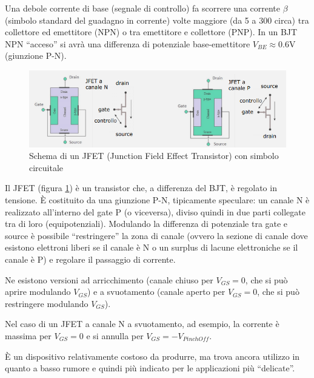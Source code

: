 \documentclass{article}
\begin{document}
\vspace{3mm}

Una debole corrente di base (segnale di controllo) fa scorrere una corrente $\beta$ (simbolo standard del guadagno in corrente) volte maggiore (da 5 a 300 circa) tra collettore ed emettitore (NPN) o tra emettitore e collettore (PNP). In un BJT NPN ``acceso'' si avrà una differenza di potenziale base-emettitore $V_{BE} \approx 0.6$V (giunzione P-N).

\begin{figure}[h]
  \centering
  \includegraphics[scale=0.6]{IM_JFET}
  \caption{Schema di un JFET (Junction Field Effect Transistor) con simbolo circuitale}
  \label{Schema_JFET}
\end{figure}

Il JFET (figura \ref{Schema_JFET}) è un transistor che, a differenza del BJT, è regolato in tensione. È costituito da una giunzione P-N, tipicamente speculare: un canale N è realizzato all'interno del gate P (o viceversa), diviso quindi in due parti collegate tra di loro (equipotenziali). Modulando la differenza di potenziale tra gate e source è possibile ``restringere'' la zona di canale (ovvero la sezione di canale dove esistono elettroni liberi se il canale è N o un surplus di lacune elettroniche se il canale è P) e regolare il passaggio di corrente. 

\vspace{3mm}

Ne esistono versioni ad arricchimento (canale chiuso per $V_{GS} = 0$, che si può aprire modulando $V_{GS}$) e a svuotamento (canale aperto per $V_{GS} = 0$, che si può restringere modulando $V_{GS}$).

\vspace{3mm}

Nel caso di un JFET a canale N a svuotamento, ad esempio, la corrente è massima per $V_{GS} = 0$ e si annulla per  $V_{GS} = - V_{PinchOff}$.

\vspace{3mm}

È un dispositivo relativamente costoso da produrre, ma trova ancora utilizzo in quanto a basso rumore e quindi più indicato per le applicazioni più ``delicate''.
\end{document}
